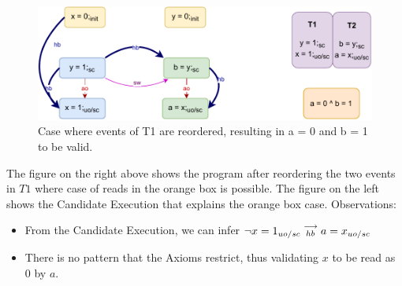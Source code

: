         \begin{figure}[H]
            \centering
            \includegraphics[scale=0.7]{5.InstructionReordering/4.ValidReorderingCandidate/Example7R(Wuo,sc-Wsc).pdf}
            \caption{Case where events of T1 are reordered, resulting in  a = 0 and b = 1 to be valid.}
        \end{figure}
        
        The figure on the right above shows the program after reordering the two events in $T1$ where case of reads in the orange box is possible. 
        The figure on the left shows the Candidate Execution that explains the orange box case. 
        Observations:
        \begin{itemize}
            \item From the Candidate Execution, we can infer $\neg x=1_{uo/sc}\stackrel{\longrightarrow}{_{hb}}a=x_{uo/sc}$
            \item There is no pattern that the Axioms restrict, thus validating $x$ to be read as $0$ by $a$. 
        \end{itemize}




